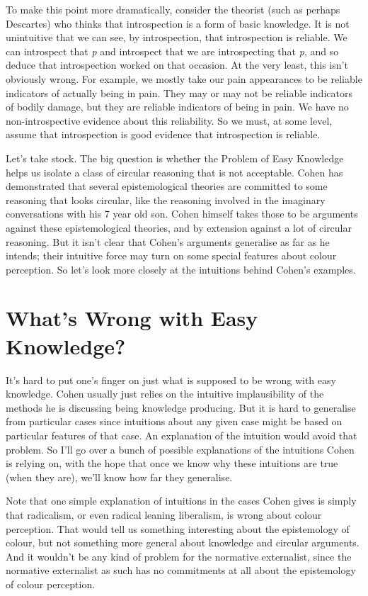 \documentclass[
  10pt,
  letterpaper,
  twoside]{scrbook}
\begin{document}
To make this point more dramatically, consider the theorist (such as
perhaps Descartes) who thinks that introspection is a form of basic
knowledge. It is not unintuitive that we can see, by introspection, that
introspection is reliable. We can introspect that \emph{p} and
introspect that we are introspecting that \emph{p}, and so deduce that
introspection worked on that occasion. At the very least, this isn't
obviously wrong. For example, we mostly take our pain appearances to be
reliable indicators of actually being in pain. They may or may not be
reliable indicators of bodily damage, but they are reliable indicators
of being in pain. We have no non-introspective evidence about this
reliability. So we must, at some level, assume that introspection is
good evidence that introspection is reliable.

Let's take stock. The big question is whether the Problem of Easy
Knowledge helps us isolate a class of circular reasoning that is not
acceptable. Cohen has demonstrated that several epistemological theories
are committed to some reasoning that looks circular, like the reasoning
involved in the imaginary conversations with his 7 year old son. Cohen
himself takes those to be arguments against these epistemological
theories, and by extension against a lot of circular reasoning. But it
isn't clear that Cohen's arguments generalise as far as he intends;
their intuitive force may turn on some special features about colour
perception. So let's look more closely at the intuitions behind Cohen's
examples.

\section{What's Wrong with Easy
Knowledge?}\label{whatswrongwitheasyknowledge}

It's hard to put one's finger on just what is supposed to be wrong with
easy knowledge. Cohen usually just relies on the intuitive
implausibility of the methods he is discussing being knowledge
producing. But it is hard to generalise from particular cases since
intuitions about any given case might be based on particular features of
that case. An explanation of the intuition would avoid that problem. So
I'll go over a bunch of possible explanations of the intuitions Cohen is
relying on, with the hope that once we know why these intuitions are
true (when they are), we'll know how far they generalise.

Note that one simple explanation of intuitions in the cases Cohen gives
is simply that radicalism, or even radical leaning liberalism, is wrong
about colour perception. That would tell us something interesting about
the epistemology of colour, but not something more general about
knowledge and circular arguments. And it wouldn't be any kind of problem
for the normative externalist, since the normative externalist as such
has no commitments at all about the epistemology of colour perception.
\end{document}

